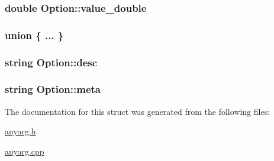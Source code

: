 \hypertarget{struct_option_a9bb84a8ae8e06721694e5b8fb6a35775}{
\subsubsection[{value\-\_\-double}]{\setlength{\rightskip}{0pt plus 5cm}double Option\-::value\-\_\-double}}\label{struct_option_a9bb84a8ae8e06721694e5b8fb6a35775}
\hypertarget{struct_option_a617516f634d91ac81b7a5d32bf727db9}{\subsubsection[{"@1}]{\setlength{\rightskip}{0pt plus 5cm}union \{ ... \} }}\label{struct_option_a617516f634d91ac81b7a5d32bf727db9}
\hypertarget{struct_option_acead0e0fe56632ced43978c9a09a60db}{
\subsubsection[{desc}]{\setlength{\rightskip}{0pt plus 5cm}string Option\-::desc}}\label{struct_option_acead0e0fe56632ced43978c9a09a60db}
\hypertarget{struct_option_a565dc0f1d839f046c68c12d1b4a6a5fa}{
\subsubsection[{meta}]{\setlength{\rightskip}{0pt plus 5cm}string Option\-::meta}}\label{struct_option_a565dc0f1d839f046c68c12d1b4a6a5fa}


The documentation for this struct was generated from the following files\-:\begin{DoxyCompactItemize}
\item 
\hyperlink{anyarg_8h}{anyarg.\-h}\item 
\hyperlink{anyarg_8cpp}{anyarg.\-cpp}\end{DoxyCompactItemize}
